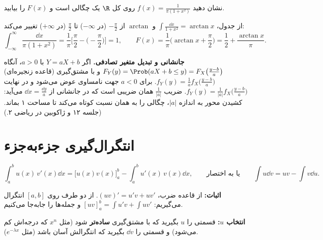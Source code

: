 \begin{example}
نشان دهید $f(x)=\frac{1}{\pi(1+x^2)}$ روی کل $\R$ یک چگالی است و $F(x)$ را بیابید.
\begin{solution}
از جدول، $\int\frac{\dd x}{1+x^2}=\arctan x$ و $\arctan$ از $-\frac\pi2$ (در $-\infty$) تا $\frac\pi2$ (در $+\infty$) تغییر می‌کند:
\[
\int_{-\infty}^\infty\frac{\dd x}{\pi(1+x^2)}=\frac1\pi\Big[\frac\pi2-\Big(-\frac\pi2\Big)\Big]=1,\qquad
F(x)=\frac1\pi\Big(\arctan x+\frac\pi2\Big)=\frac12+\frac{\arctan x}{\pi}.
\]
\end{solution}
\end{example}

\begin{note}
\notetitle \textbf{جانشانی و تبدیل متغیر تصادفی.} اگر $Y=aX+b$ با $a>0$، آنگاه $F_Y(y)=\Prob(aX+b\le y)=F_X\big(\frac{y-b}{a}\big)$ و با مشتق‌گیری (قاعده زنجیره‌ای) $f_Y(y)=\frac1af_X\big(\frac{y-b}{a}\big)$. برای $a<0$ جهت نامساوی عوض می‌شود و در نهایت $f_Y(y)=\frac{1}{|a|}f_X\big(\frac{y-b}{a}\big)$. ضریب $\frac1{|a|}$ همان ضریبی است که در جانشانی از $\dd x=\frac{\dd y}{a}$ می‌آید: کشیدن محور به اندازه $|a|$، چگالی را به همان نسبت کوتاه می‌کند تا مساحت ۱ بماند. (جلسه ۱۲ و ژاکوبین در ریاضی ۲.)
\end{note}

\section{انتگرال‌گیری جزءبه‌جزء}
\begin{theorem}
\[
\int_a^bu(x)\,v'(x)\dd x=\Big[u(x)v(x)\Big]_a^b-\int_a^bu'(x)\,v(x)\dd x,
\qquad\text{یا به اختصار}\qquad\int u\dd v=uv-\int v\dd u .
\]
\end{theorem}
\textbf{اثبات:} از قاعده ضرب، $(uv)'=u'v+uv'$. از دو طرف روی $[a,b]$ انتگرال می‌گیریم: $[uv]_a^b=\int u'v+\int uv'$ و جمله‌ها را جابه‌جا می‌کنیم.

\textbf{انتخاب $u$:} قسمتی را $u$ بگیرید که با مشتق‌گیری \textbf{ساده‌تر} شود (مثل $x^n$ که درجه‌اش کم می‌شود) و قسمتی را $\dd v$ بگیرید که انتگرالش آسان باشد (مثل $e^{-\lambda x}$).

